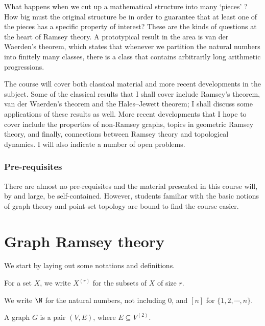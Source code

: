 \documentclass[a4paper]{article}
\begin{document}
\maketitle
{\small
\setlength{\parindent}{0em}
\setlength{\parskip}{1em}

What happens when we cut up a mathematical structure into many `pieces' ? How big must the original structure be in order to guarantee that at least one of the pieces has a specific property of interest? These are the kinds of questions at the heart of Ramsey theory. A prototypical result in the area is van der Waerden's theorem, which states that whenever we partition the natural numbers into finitely many classes, there is a class that contains arbitrarily long arithmetic progressions.

The course will cover both classical material and more recent developments in the subject. Some of the classical results that I shall cover include Ramsey's theorem, van der Waerden's theorem and the Hales--Jewett theorem; I shall discuss some applications of these results as well. More recent developments that I hope to cover include the properties of non-Ramsey graphs, topics in geometric Ramsey theory, and finally, connections between Ramsey theory and topological dynamics. I will also indicate a number of open problems.

\subsubsection*{Pre-requisites}
There are almost no pre-requisites and the material presented in this course will, by and large, be self-contained. However, students familiar with the basic notions of graph theory and point-set topology are bound to find the course easier.
}
\tableofcontents

\section{Graph Ramsey theory}
We start by laying out some notations and definitions.
\begin{notation}
  For a set $X$, we write $X^{(r)}$ for the subsets of $X$ of size $r$.
\end{notation}
\begin{notation}
  We write $\N$\index{$\N$} for the natural numbers, not including $0$, and $[n]$\index{$[n]$} for $\{1, 2, \cdots, n\}$.
\end{notation}

\begin{defi}[Graph]
  A graph $G$ is a pair $(V, E)$, where $E \subseteq V^{(2)}$.
\end{defi}
\end{document}
